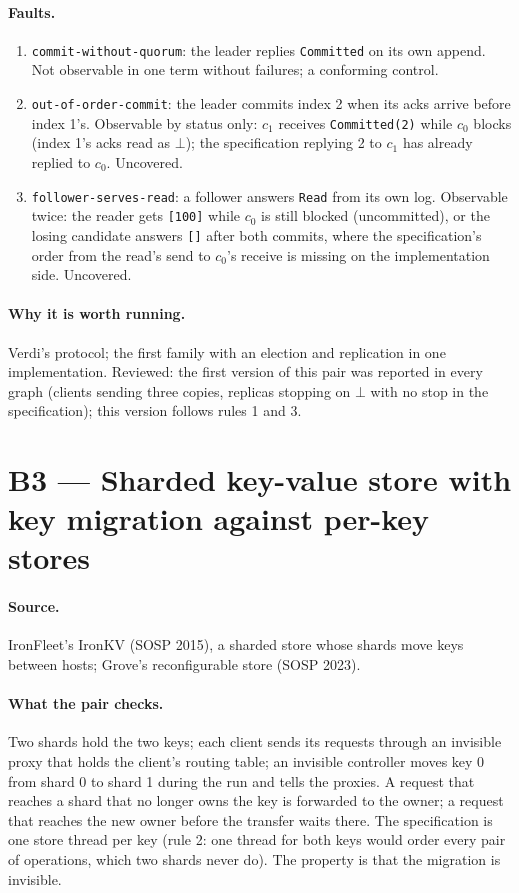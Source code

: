 \documentclass[11pt,a4paper]{article}
\newcommand{\code}[1]{\texttt{#1}}
\begin{document}
\paragraph{Faults.}
\begin{enumerate}
  \item \code{commit-without-quorum}: the leader replies \code{Committed} on its own append.
        Not observable in one term without failures; a conforming control.
  \item \code{out-of-order-commit}: the leader commits index 2 when its acks arrive before index
        1's. Observable by status only: $c_1$ receives \code{Committed(2)} while $c_0$ blocks
        (index 1's acks read as $\bot$); the specification replying 2 to $c_1$ has already
        replied to $c_0$. Uncovered.
  \item \code{follower-serves-read}: a follower answers \code{Read} from its own log. Observable
        twice: the reader gets \code{[100]} while $c_0$ is still blocked (uncommitted), or the
        losing candidate answers \code{[]} after both commits, where the specification's order
        from the read's send to $c_0$'s receive is missing on the implementation side. Uncovered.
\end{enumerate}

\paragraph{Why it is worth running.} Verdi's protocol; the first family with an election and
replication in one implementation. Reviewed: the first version of this pair was reported in
every graph (clients sending three copies, replicas stopping on $\bot$ with no stop in the
specification); this version follows rules 1 and 3.

\section{B3 --- Sharded key-value store with key migration against per-key stores}

\paragraph{Source.} IronFleet's IronKV (SOSP 2015), a sharded store whose shards move keys
between hosts; Grove's reconfigurable store (SOSP 2023).

\paragraph{What the pair checks.} Two shards hold the two keys; each client sends its requests
through an invisible proxy that holds the client's routing table; an invisible controller moves
key 0 from shard 0 to shard 1 during the run and tells the proxies. A request that reaches a
shard that no longer owns the key is forwarded to the owner; a request that reaches the new
owner before the transfer waits there. The specification is one store thread per key (rule 2:
one thread for both keys would order every pair of operations, which two shards never do).
The property is that the migration is invisible.
\end{document}
